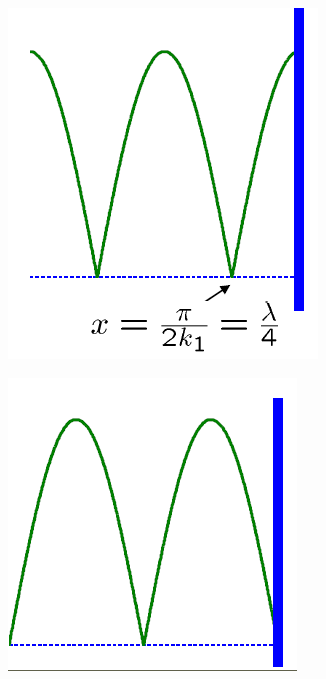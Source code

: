 	\begin{center}
	\begin{minipage}{0.25\textwidth}
	\includegraphics[scale=0.32]{acoustics/ch4/5}
	\label{fig:4.5}
	\end{minipage}		
	\begin{minipage}{0.25\textwidth}
	\includegraphics[scale=0.4]{acoustics/ch4/6}
	\label{fig:4.6}
	\end{minipage}		
	\end{center}
	
